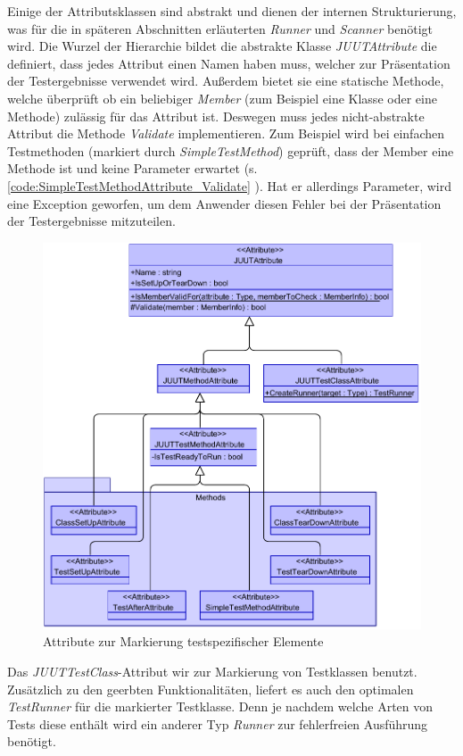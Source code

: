 Einige der Attributsklassen sind abstrakt und dienen der internen Strukturierung, was für die in späteren Abschnitten erläuterten \textit{Runner} und \textit{Scanner} benötigt wird. Die Wurzel der Hierarchie bildet die abstrakte Klasse \textit{JUUTAttribute} die definiert, dass jedes Attribut einen Namen haben muss, welcher zur Präsentation der Testergebnisse verwendet wird. Außerdem bietet sie eine statische Methode, welche überprüft ob ein beliebiger \textit{Member} (zum Beispiel eine Klasse oder eine Methode) zulässig für das Attribut ist. Deswegen muss jedes nicht-abstrakte Attribut die Methode \textit{Validate} implementieren. Zum Beispiel wird bei einfachen Testmethoden (markiert durch \textit{SimpleTestMethod}) geprüft, dass der Member eine Methode ist und keine Parameter erwartet (s. \autoref{code:SimpleTestMethodAttribute_Validate} ). Hat er allerdings Parameter, wird eine Exception geworfen, um dem Anwender diesen Fehler bei der Präsentation der Testergebnisse mitzuteilen.

\begin{figure}[h]
\centering
\includegraphics[width=0.9\linewidth]{images/Kapitel_Ergebnis/Attributes}
\caption[Attribute zur Markierung testspezifischer Elemente]{Attribute zur Markierung testspezifischer Elemente}
\label{fig:Attributes}
\end{figure}

Das \textit{JUUTTestClass}-Attribut wir zur Markierung von Testklassen benutzt. Zusätzlich zu den geerbten Funktionalitäten, liefert es auch den optimalen \textit{TestRunner} für die markierter Testklasse. Denn je nachdem welche Arten von Tests diese enthält wird ein anderer Typ \textit{Runner} zur fehlerfreien Ausführung benötigt.


